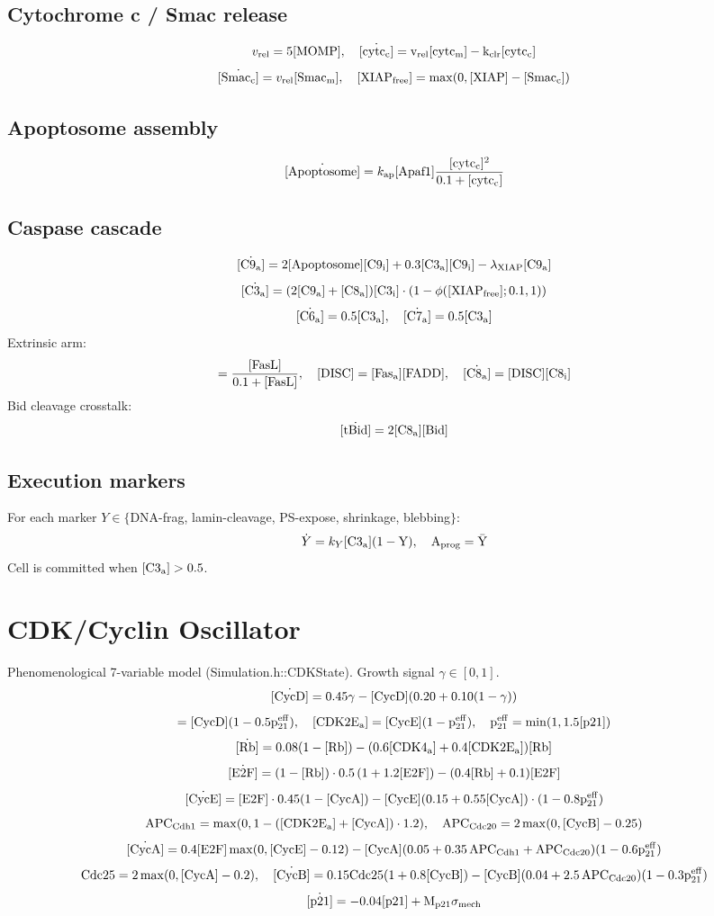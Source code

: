 \documentclass[11pt,a4paper]{article}
\newcommand{\eq}[1]{\begin{equation}#1\end{equation}}
\begin{document}
\subsection{Cytochrome c / Smac release}
\eq{ v_{\rm rel}=5[\rm MOMP],\quad \dot{[\rm cytc_c]}=v_{\rm rel}[\rm cytc_m]-k_{\rm clr}[\rm cytc_c] }
\eq{ \dot{[\rm Smac_c]}=v_{\rm rel}[\rm Smac_m],\quad [\rm XIAP_{\rm free}]=\max(0,[\rm XIAP]-[\rm Smac_c]) }

\subsection{Apoptosome assembly}
\eq{ \dot{[\rm Apoptosome]} = k_{\rm ap}[\rm Apaf1]\frac{[\rm cytc_c]^2}{0.1+[\rm cytc_c]} }

\subsection{Caspase cascade}
\eq{ \dot{[\rm C9_a]}=2[\rm Apoptosome][\rm C9_i]+0.3[\rm C3_a][\rm C9_i] - \lambda_{\rm XIAP}[\rm C9_a] }
\eq{ \dot{[\rm C3_a]}=(2[\rm C9_a]+[\rm C8_a])[\rm C3_i]\cdot(1-\phi([\rm XIAP_{\rm free}];0.1,1)) }
\eq{ \dot{[\rm C6_a]}=0.5[\rm C3_a],\quad \dot{[\rm C7_a]}=0.5[\rm C3_a] }
Extrinsic arm:
\eq{ [\rm Fas_a]=\frac{[\rm FasL]}{0.1+[\rm FasL]},\quad [\rm DISC]=[\rm Fas_a][\rm FADD],\quad \dot{[\rm C8_a]}=[\rm DISC][\rm C8_i] }
Bid cleavage crosstalk:
\eq{ \dot{[\rm tBid]}=2[\rm C8_a][\rm Bid] }

\subsection{Execution markers}
For each marker $Y\in\{$DNA-frag, lamin-cleavage, PS-expose, shrinkage, blebbing$\}$:
\eq{ \dot Y = k_Y[\rm C3_a](1-Y),\quad A_{\rm prog}=\bar Y }
Cell is committed when $[\rm C3_a]>0.5$.

\clearpage
\section{CDK/Cyclin Oscillator}
\label{sec:cdk}
Phenomenological 7-variable model (Simulation.h::CDKState). Growth signal $\gamma\in[0,1]$.
\eq{ \dot{[\rm CycD]}=0.45\gamma-[\rm CycD](0.20+0.10(1-\gamma)) }
\eq{ [\rm CDK4_a]=[\rm CycD](1-0.5 p_{21}^{\rm eff}),\quad [\rm CDK2E_a]=[\rm CycE](1-p_{21}^{\rm eff}),\quad p_{21}^{\rm eff}=\min(1,1.5[\rm p21]) }
\eq{ \dot{[\rm Rb]}=0.08(1-[\rm Rb]) - (0.6[\rm CDK4_a]+0.4[\rm CDK2E_a])[\rm Rb] }
\eq{ \dot{[\rm E2F]}=(1-[\rm Rb])\cdot 0.5\,(1+1.2[\rm E2F])-(0.4[\rm Rb]+0.1)[\rm E2F] }
\eq{ \dot{[\rm CycE]}=[\rm E2F]\cdot 0.45(1-[\rm CycA])-[\rm CycE](0.15+0.55[\rm CycA])\cdot(1-0.8 p_{21}^{\rm eff}) }
\eq{ \mathrm{APC}_{\rm Cdh1}=\max(0,1-([\rm CDK2E_a]+[\rm CycA])\cdot 1.2),\quad \mathrm{APC}_{\rm Cdc20}=2\max(0,[\rm CycB]-0.25) }
\eq{ \dot{[\rm CycA]}=0.4[\rm E2F]\max(0,[\rm CycE]-0.12)-[\rm CycA](0.05+0.35\,\mathrm{APC}_{\rm Cdh1}+\mathrm{APC}_{\rm Cdc20})(1-0.6 p_{21}^{\rm eff}) }
\eq{ \mathrm{Cdc25}=2\max(0,[\rm CycA]-0.2),\quad \dot{[\rm CycB]}=0.15\mathrm{Cdc25}(1+0.8[\rm CycB])-[\rm CycB](0.04+2.5\,\mathrm{APC}_{\rm Cdc20})(1-0.3 p_{21}^{\rm eff}) }
\eq{ \dot{[\rm p21]}=-0.04[\rm p21]+M_{\rm p21}\sigma_{\rm mech} }
\end{document}
